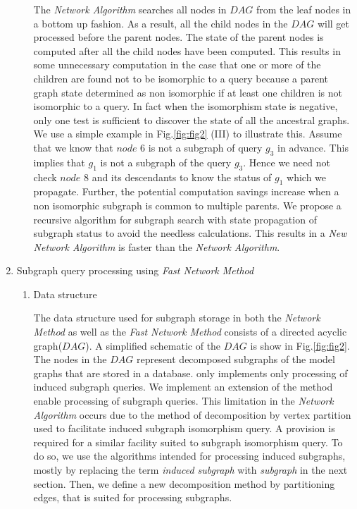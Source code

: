 \begin{enumerate}
\begin{enumerate}
The \textit{Network Algorithm} searches all nodes in $DAG$ from the leaf nodes in a bottom up fashion.
As a result, all the child nodes in the $DAG$ will get processed before the parent nodes. 
The state of the parent nodes is computed after all the child nodes have been computed. 
This results in some unnecessary computation in the case that one or more of the children are found not to be isomorphic to a query because a parent graph state determined as non isomorphic if at least one children is not isomorphic to a query.  
In fact when the isomorphism state is negative, only one test is sufficient to discover the state of all the ancestral graphs. 
We use a simple example in Fig.\ref{fig:fig2} (III) to illustrate this.
Assume that we know that $node$ 6 is not a subgraph of query $g_3$ in advance. 
This implies that $g_1$ is not a subgraph of the query $g_3$.
Hence we need not check $node$ 8 and its descendants to know the status of $g_1$ which we propagate. 
Further, the potential computation savings increase when a non isomorphic subgraph is common to multiple parents. 
We propose a recursive algorithm for subgraph search with state propagation of subgraph status to avoid the needless calculations. 
This results in a \textit{New Network Algorithm} is faster than the \textit{Network Algorithm}.

\end{enumerate}

\item  Subgraph query processing using \textit{Fast Network Method}

\begin{enumerate}

\item Data structure

The data structure used for subgraph storage in both the \textit{Network Method} as well as the \textit{Fast Network Method} consists of a directed acyclic graph($DAG$). 
A simplified schematic of the $DAG$ is show in Fig.\ref{fig:fig2}. 
The nodes in the $DAG$ represent decomposed subgraphs of the model graphs that are stored in a database. 
only implements only processing of induced subgraph queries. 
We implement an extension of the method enable processing of subgraph queries. 
This limitation in the \textit{Network Algorithm} occurs due to the method of decomposition by vertex partition used to facilitate induced subgraph isomorphism query. 
A provision is required for a similar facility suited to subgraph isomorphism query. 
To do so, we use the algorithms intended for processing induced subgraphs, mostly by replacing the term \textit{induced subgraph} with \textit{subgraph} in the next section.
Then, we define a new decomposition method by partitioning edges, that is suited for processing subgraphs.



\end{enumerate}
\end{enumerate}
